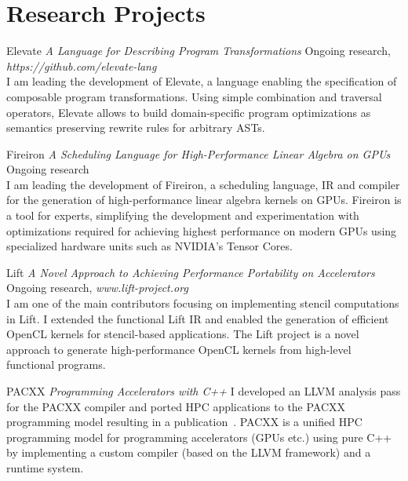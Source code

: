 \documentclass[11pt,a4paper]{moderncv}
\begin{document}
\section{Research Projects}
    \cventry{}
                    {}{}{}{}{}

					{Elevate}
					{\textit{A Language for Describing Program Transformations}}{}{}
                    {Ongoing research, \textit{https://github.com/elevate-lang}\\
					 I am leading the development of Elevate, a language enabling the specification of composable program transformations.
                     Using simple combination and traversal operators, Elevate allows to build domain-specific program optimizations as semantics preserving rewrite rules for arbitrary ASTs.
					}

					{Fireiron}
					{\textit{A Scheduling Language for High-Performance Linear Algebra on GPUs}}{}{}
                    {Ongoing research\\
					 I am leading the development of Fireiron, a scheduling language, IR and compiler for the generation of high-performance linear algebra kernels on GPUs.
                     Fireiron is a tool for experts, simplifying the development and experimentation with optimizations required for achieving highest performance on modern GPUs using specialized hardware units such as NVIDIA's Tensor Cores.
					}

					{Lift}
					{\textit{A Novel Approach to Achieving Performance Portability on Accelerators}}{}{}
					{Ongoing research, \textit{www.lift-project.org}\\
					 I am one of the main contributors focusing on implementing stencil computations in Lift.
					 I extended the functional Lift IR and enabled the generation
					 of efficient OpenCL kernels for stencil-based applications.
					 The Lift project is a novel approach to generate high-performance OpenCL kernels
					 from high-level functional programs.\\
					}

					{PACXX}
					{\textit{Programming Accelerators with C++}}{}{}{
					 I developed an LLVM analysis pass for the PACXX compiler and ported HPC applications
					 to the PACXX programming model resulting in a publication~\cite{haidl}.
					 PACXX is a unified HPC programming model for programming accelerators
					 (GPUs etc.) using pure C++ by implementing a custom compiler
					 (based on the LLVM framework) and a runtime system.
					}
\end{document}
